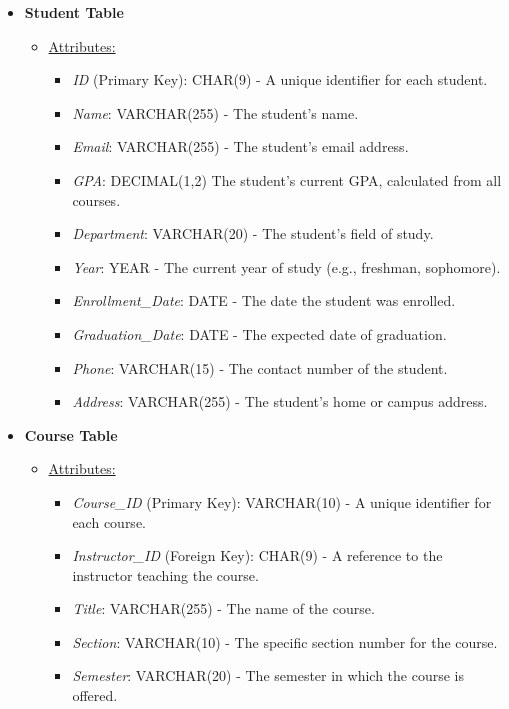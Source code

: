 \documentclass[12pt]{article}
\begin{document}
\begin{itemize}
    \item \textbf{Student Table}
    \begin{itemize}
        \item \underline{Attributes:}
        \begin{itemize}
            \item \textit{ID} (Primary Key): CHAR(9) - A unique identifier for each student.
            \item \textit{Name}: VARCHAR(255) - The student's name.
            \item \textit{Email}: VARCHAR(255) - The student's email address.
            \item \textit{GPA}: DECIMAL(1,2) The student's current GPA, calculated from all courses.
            \item \textit{Department}: VARCHAR(20) - The student's field of study.
            \item \textit{Year}: YEAR - The current year of study (e.g., freshman, sophomore).
            \item \textit{Enrollment\_Date}: DATE - The date the student was enrolled.
            \item \textit{Graduation\_Date}: DATE - The expected date of graduation.
            \item \textit{Phone}: VARCHAR(15) - The contact number of the student.
            \item \textit{Address}: VARCHAR(255) - The student's home or campus address.
        \end{itemize}
    \end{itemize}
    \pagebreak
    \item \textbf{Course Table}
    \begin{itemize}
        \item \underline{Attributes:}
        \begin{itemize}
            \item \textit{Course\_ID} (Primary Key): VARCHAR(10) - A unique identifier for each course.
            \item \textit{Instructor\_ID} (Foreign Key): CHAR(9) - A reference to the instructor teaching the course.
            \item \textit{Title}: VARCHAR(255) - The name of the course.
            \item \textit{Section}: VARCHAR(10) - The specific section number for the course.
            \item \textit{Semester}: VARCHAR(20) - The semester in which the course is offered.

\end{itemize}
\end{itemize}
\end{itemize}
\end{document}
